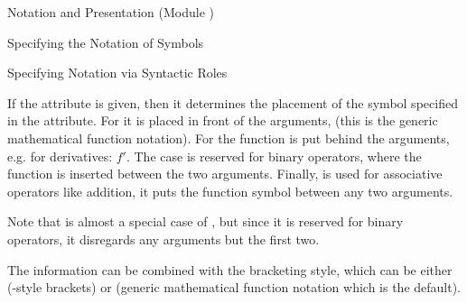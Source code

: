 \begin{tchapter}[id=pres,short=Notation and Presentation]{Notation and Presentation (Module {})}
\begin{tsection}[id=presentation,short=Notation of Symbols]{Specifying the Notation of Symbols}
\begin{tsubsection}[id=pres-declarative]{Specifying Notation via Syntactic Roles}
\begin{description}
  If the {} attribute is given, then it determines
  the placement of the symbol specified in the {}
  attribute. For {} it is placed in front of the
  arguments, (this is the generic mathematical function notation). For
  {} the function is put behind the arguments, e.g.
  for derivatives: $f'$. The case {} is reserved for
  binary operators, where the function is inserted between the two arguments. Finally,
  {} is used for associative operators like addition,
  it puts the function symbol between any two arguments.
  
  Note that {} is almost a special case of
  {}, but since it is reserved for binary
  operators, it disregards any arguments but the first two.
\item[{\attribute{bracket-style}{presentation}}] The
  {} information can be combined with the
  bracketing style, which can be either
  {} ({}-style brackets) or
  {} (generic mathematical function
  notation which is the default).
  

\end{description}
\end{tsubsection}
\end{tsection}
\end{tchapter}
